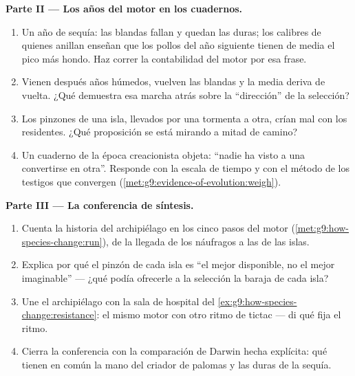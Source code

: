 \begin{problem}
\medskip\noindent\textbf{Parte II --- Los años del motor en los
cuadernos.}
\begin{enumerate}[resume]
  \item Un año de sequía: las  blandas fallan y quedan las
        duras; los calibres de quienes anillan enseñan que los pollos
        del año siguiente tienen de media el pico más hondo. Haz correr
        la contabilidad del motor por esa frase.
  \item Vienen después años húmedos, vuelven las  blandas y la
        media deriva de vuelta. ¿Qué demuestra esa marcha atrás sobre
        la ``dirección'' de la selección?
  \item Los pinzones de una isla, llevados por una tormenta a otra,
        crían mal con los residentes. ¿Qué proposición se está mirando
        a mitad de camino?
  \item Un cuaderno de la época creacionista objeta: ``nadie ha visto a
        una  convertirse en otra''. Responde con la escala de
        tiempo y con el método de los testigos que convergen
        (\cref{met:g9:evidence-of-evolution:weigh}).
\end{enumerate}

\medskip\noindent\textbf{Parte III --- La conferencia de
síntesis.}
\begin{enumerate}[resume]
  \item Cuenta la historia del archipiélago en los cinco pasos del
        motor (\cref{met:g9:how-species-change:run}), de la llegada de
        los náufragos a las  de las islas.
  \item Explica por qué el pinzón de cada isla es ``el mejor
        disponible, no el mejor imaginable'' --- ¿qué podía ofrecerle a
        la selección la baraja de cada isla?
  \item Une el archipiélago con la sala de hospital del
        \cref{ex:g9:how-species-change:resistance}: el mismo motor con
        otro ritmo de tictac --- di qué fija el ritmo.
  \item Cierra la conferencia con la comparación de Darwin hecha
        explícita: qué tienen en común la mano del criador de palomas y
        las  duras de la sequía.
\end{enumerate}
\end{problem}
